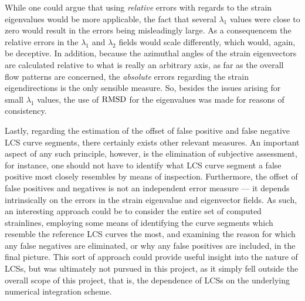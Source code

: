 While one could argue that using \emph{relative} errors with regards to
the strain eigenvalues would be more applicable, the fact that several
$\lambda_{1}$ values were close to zero would result in the errors being
misleadingly large. As a consequencem the relative errors in the
$\lambda_{1}$ and $\lambda_{2}$ fields would scale differently, which would,
again, be deceptive. In addition, because the azimuthal angles of the strain
eigenvectors are calculated relative to what is really an arbitrary axis,
as far as the overall flow patterns are concerned, the \emph{absolute} errors
regarding the strain eigendirections is the only sensible measure. So, besides
the issues arising for small $\lambda_{1}$ values, the use of $\operatorname{RMSD}$ for
the eigenvalues was made for reasons of consistency.

Lastly, regarding the estimation of the offset of false positive and false
negative LCS curve segments, there certainly exists other relevant measures.
An important aspect of any such principle, however, is the elimination of
subjective assessment, for instance, one should not have to identify
what LCS curve segment a false positive most closely resembles by means of
inspection. Furthermore, the offset of false positives and negatives is not
an independent error measure --- it depends intrinsically on the errors
in the strain eigenvalue and eigenvector fields. As such, an interesting
approach could be to consider the entire set of computed strainlines, employing
some means of identifying the curve segments which resemble the reference
LCS curves the most, and examining the reason for which any false negatives
are eliminated, or why any false positives are included, in the final picture.
This sort of approach could provide useful insight into the nature of LCSs, but
was ultimately not pursued in this project, as it simply fell outside the
overall scope of this project, that is, the dependence of LCSs on the
underlying numerical integration scheme.


